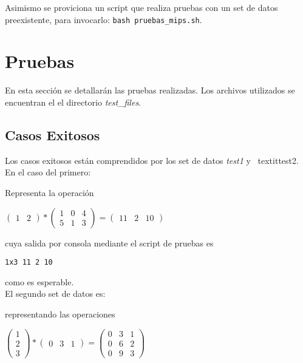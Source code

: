\documentclass[10pt,a4paper]{article}
\begin{document}
		Asimismo se proviciona un script que realiza pruebas con un set de datos preexistente, para invocarlo: \texttt{bash pruebas\_mips.sh}.

\section{Pruebas}
	En esta sección se detallarán las pruebas realizadas. Los archivos utilizados se encuentran el el directorio \textit{test\_files}.
	\subsection{Casos Exitosos}
		Los casos exitosos están comprendidos por los set de datos \textit{test1} y \	textit{test2}.	
		En el caso del	 primero:\	
	
		
	
		Representa la operación
		\begin{center}
		$\begin{pmatrix}
		1 & 2
		\end{pmatrix}
		*
		\begin{pmatrix}
		1 & 0 & 4 \\ 5 & 1 & 3
		\end{pmatrix}
		=
		\begin{pmatrix}
		11 & 2 & 10
		\end{pmatrix}
		$
		\end{center}
	
		cuya salida por consola mediante el script de pruebas es
	
		\texttt{1x3 11 2 10 }
	
		como es esperable.\\
	
		El segundo set de datos es:
		
	
		representando las operaciones
	
		\begin{center}
		$\begin{pmatrix}
		1 \\ 2 \\ 3
		\end{pmatrix}
		*
		\begin{pmatrix}
		0 & 3 & 1
		\end{pmatrix}
		=
		\begin{pmatrix}
		0 & 3 & 1 \\ 0 & 6 & 2 \\ 0 & 9 & 3
		\end{pmatrix}
		$\end{center}
	
\end{document}

